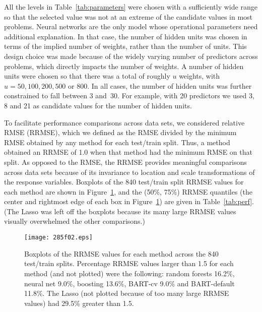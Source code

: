 \documentclass[aoas,nameyear,dvips]{arximspdf}
\begin{document}
All the levels in Table~\ref{tab:parameters} were chosen with a
sufficiently wide range so that the selected value was not at an extreme of
the candidate values in most problems.  Neural networks are the only model
whose operational parameters need additional explanation.  In that case,
the number of hidden units was chosen in terms of the implied number
of weights, rather than the number of units.  This design choice was
made because of the widely varying number of predictors across problems,
which directly impacts the number of weights.  A number of hidden units
were chosen so that there was a total of roughly $u$ weights, with $u=
50, 100, 200, 500$ or $800$.
In all cases, the number of hidden units was further constrained to fall
between 3 and~30.
For example, with 20 predictors we used 3, 8 and 21 as candidate
values for the number of hidden units.




To facilitate performance comparisons across data sets, we considered
relative RMSE (RRMSE), which we defined as the RMSE divided by the
minimum RMSE obtained by any method for each test/train split.  Thus, a
method obtained an RRMSE of 1.0 when that method had the minimum RMSE
on that split.  As opposed to the RMSE, the RRMSE provides meaningful
comparisons across data sets because of its invariance to location and
scale transformations of the response variables.  Boxplots of the 840
test/train split RRMSE values for each method are shown in
Figure~\ref{fig:boxplot}, and the (50\%, 75\%) RRMSE quantiles (the
center and rightmost edge of each box in Figure~\ref{fig:boxplot}) are
given in Table~\ref{tab:perf}.  (The Lasso was left off the boxplots
because its many large RRMSE values visually overwhelmed the other
comparisons.)

\begin{figure}[b]

\texttt{[image: 285f02.eps]}

\caption{Boxplots of the RRMSE values for each method across the 840 test/train splits.
Percentage RRMSE  values larger than 1.5 for each method (and not plotted)
were the following: random forests 16.2\%, neural net 9.0\%, boosting 13.6\%, BART-cv
9.0\% and BART-default 11.8\%.  The Lasso (not plotted because of too many
large RRMSE values) had 29.5\% greater than 1.5.}\label{fig:boxplot}
\end{figure}
\end{document}
